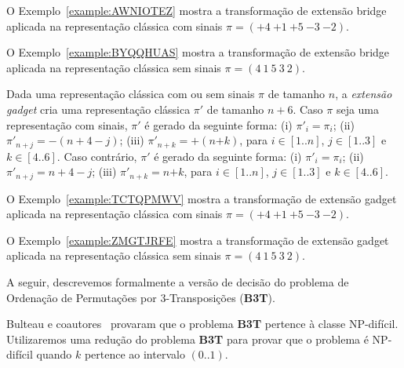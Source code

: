 O Exemplo~\ref{example:AWNIOTEZ} mostra a transformação de extensão bridge aplicada na representação clássica com sinais $\pi=({+4}~{+1}~{+5}~{-3}~{-2})$.



O Exemplo~\ref{example:BYQQHUAS} mostra a transformação de extensão bridge aplicada na representação clássica sem sinais $\pi=(4~1~5~3~2)$.



\begin{definition}
Dada uma representação clássica com ou sem sinais $\pi$ de tamanho $n$, a \emph{extensão gadget} cria uma representação clássica $\pi'$ de tamanho $n + 6$. Caso $\pi$ seja uma representação com sinais, $\pi'$ é gerado da seguinte forma: (i) $\pi'_{i} = \pi_i$; (ii) $\pi'_{n+j} = -(n+4-j)$; (iii) $\pi'_{n+k} = +(n{+k})$, para $i \in [1..n]$, $j \in [1..3]$ e $k \in [4..6]$. Caso contrário, $\pi'$ é gerado da seguinte forma: (i) $\pi'_{i} = \pi_i$; (ii) $\pi'_{n+j} = n+4-j$; (iii) $\pi'_{n+k} = n{+k}$, para $i \in [1..n]$, $j \in [1..3]$ e $k \in [4..6]$.
\end{definition}

O Exemplo~\ref{example:TCTQPMWV} mostra a transformação de extensão gadget aplicada na representação clássica com sinais $\pi=({+4}~{+1}~{+5}~{-3}~{-2})$.



O Exemplo~\ref{example:ZMGTJRFE} mostra a transformação de extensão gadget aplicada na representação clássica sem sinais $\pi=(4~1~5~3~2)$.

\pagebreak


A seguir, descrevemos formalmente a versão de decisão do problema de Ordenação de Permutações por 3-Transposições (\textbf{B3T}).

\begin{decision}
\end{decision}

Bulteau e coautores~\cite{2012-bulteau-etal} provaram que o problema \textbf{B3T} pertence à classe NP-difícil. Utilizaremos uma redução do problema \textbf{B3T} para provar que o problema \SbPRT{} é NP-difícil quando $k$ pertence ao intervalo $(0..1)$.

